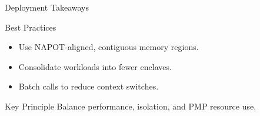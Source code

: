 \documentclass[aspectratio=169]{beamer}
\begin{document}

\begin{frame}{Deployment Takeaways}
\begin{block}{Best Practices}
\begin{itemize}
    \item Use NAPOT-aligned, contiguous memory regions.
    \item Consolidate workloads into fewer enclaves.
    \item Batch calls to reduce context switches.
\end{itemize}
\end{block}

\begin{alertblock}{Key Principle}
Balance performance, isolation, and PMP resource use.
\end{alertblock}
\end{frame}



\end{document}
